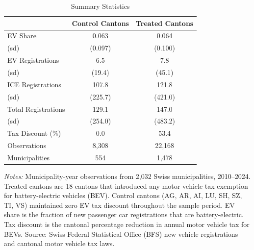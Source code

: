 \begin{table}[htbp]
\centering
\caption{Summary Statistics}
\label{tab:summary}
\small
\begin{tabular}{lcc}
\toprule
 & Control Cantons & Treated Cantons \\
\midrule
EV Share & 0.063 & 0.064 \\
    (sd) & (0.097) & (0.100) \\
EV Registrations & 6.5 & 7.8 \\
    (sd)  & (19.4) & (45.1) \\
ICE Registrations & 107.8 & 121.8 \\
    (sd)   & (225.7) & (421.0) \\
Total Registrations & 129.1 & 147.0 \\
    (sd)    & (254.0) & (483.2) \\
Tax Discount (\%) & 0.0 & 53.4 \\
\midrule
Observations & 8,308 & 22,168 \\
Municipalities & 554 & 1,478 \\
\bottomrule
\end{tabular}
\begin{tablenotes}
\item \textit{Notes:} Municipality-year observations from 2,032 Swiss municipalities, 2010--2024. Treated cantons are 18 cantons that introduced any motor vehicle tax exemption for battery-electric vehicles (BEV). Control cantons (AG, AR, AI, LU, SH, SZ, TI, VS) maintained zero EV tax discount throughout the sample period. EV share is the fraction of new passenger car registrations that are battery-electric. Tax discount is the cantonal percentage reduction in annual motor vehicle tax for BEVs. Source: Swiss Federal Statistical Office (BFS) new vehicle registrations and cantonal motor vehicle tax laws.
\end{tablenotes}
\end{table}
